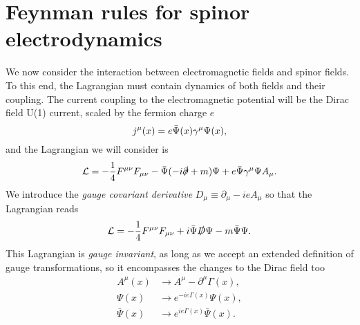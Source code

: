 \section{Feynman rules for spinor electrodynamics}
We now consider the interaction between electromagnetic fields and spinor fields. To this end, the Lagrangian must contain dynamics of both fields and their coupling. The current coupling to the electromagnetic potential will be the Dirac field U(1) current, scaled by the fermion charge $e$
\begin{equation}
    j^\mu(x)=e\Bar{\Psi}(x)\gamma^\mu\Psi(x),
\end{equation}
and the Lagrangian we will consider is
\begin{equation}
    \mathcal{L}=-\frac{1}{4}F^{\mu\nu}F_{\mu\nu}-\Bar{\Psi}(-i\slashed{\partial}+m)\Psi+e\Bar{\Psi}\gamma^\mu\Psi A_\mu.
\end{equation}
We introduce the \textit{gauge covariant derivative} $D_\mu\equiv\partial_\mu-ieA_\mu$ so that the Lagrangian reads
\begin{equation}
    \mathcal{L}=-\frac{1}{4}F^{\mu\nu}F_{\mu\nu}+i\Bar{\Psi}\slashed{D}\Psi-m\Bar{\Psi}\Psi.
\end{equation}
This Lagrangian is \textit{gauge invariant}, as long as we accept an extended definition of gauge transformations, so it encompasses the changes to the Dirac field too
\begin{equation}
    \begin{aligned}
        A^\mu(x)&\to A^\mu-\partial^\mu\Gamma(x),\\
        \Psi(x)&\to e^{-ie\Gamma(x)}\Psi(x),\\
        \bar{\Psi}(x)&\to e^{ie\Gamma(x)}\bar{\Psi}(x).
    \end{aligned}
\end{equation}


